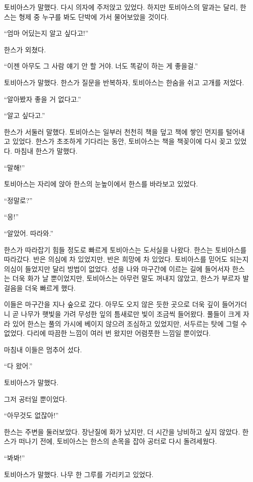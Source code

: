 토비아스가 말했다. 다시 의자에 주저앉고 있었다. 하지만 토비아스의 말과는 달리, 한스는 형제 중 누구를 봐도 단박에 가서 물어보았을 것이다.

``엄마 어딨는지 알고 싶다고!''

한스가 외쳤다.

``이젠 아무도 그 사람 얘기 안 할 거야. 너도 똑같이 하는 게 좋을걸.''

토비아스가 말했다. 한스가 질문을 반복하자, 토비아스는 한숨을 쉬고 고개를 저었다.

``알아봤자 좋을 거 없다고.''

``알고 싶다고.''

한스가 서둘러 말했다. 토비아스는 일부러 천천히 책을 덮고 책에 쌓인 먼지를 털어내고 있었다. 한스가 초조하게 기다리는 동안, 토비아스는 책을 책꽂이에 다시 꽂고 있었다. 마침내 한스가 말했다.

``말해!''

토비아스는 자리에 앉아 한스의 눈높이에서 한스를 바라보고 있었다.

``정말로?''

``응!''

``알았어. 따라와.''

한스가 따라잡기 힘들 정도로 빠르게 토비아스는 도서실을 나왔다. 한스는 토비아스를 따라갔다. 반은 의심에 차 있었지만, 반은 희망에 차 있었다. 토비아스를 믿어도 되는지 의심이 들었지만 달리 방법이 없었다. 성을 나와 마구간에 이르는 길에 들어서자 한스는 더욱 화가 날 뿐이었지만, 토비아스는 아무런 말도 꺼내지 않았고, 한스가 부르자 발걸음을 더욱 빠르게 했다.

이들은 마구간을 지나 숲으로 갔다. 아무도 오지 않은 듯한 곳으로 더욱 깊이 들어가더니 곧 나무가 햇빛을 가려 무성한 잎의 틈새로만 빛이 조금씩 들어왔다. 풀들이 크게 자라 있어 한스는 풀의 가시에 베이지 않으려 조심하고 있었지만, 서두르는 탓에 그럴 수 없었다. 다리에 따끔한 느낌이 여러 번 왔지만 어렴풋한 느낌일 뿐이었다.

마침내 이들은 멈추어 섰다.

``다 왔어.''

토비아스가 말했다.

그저 공터일 뿐이었다.

``아무것도 없잖아!''

한스는 주변을 둘러보았다. 장난질에 화가 났지만, 더 시간을 낭비하고 싶지 않았다. 한스가 떠나기 전에, 토비아스는 한스의 손목을 잡아 공터로 다시 돌려세웠다.

``봐봐!''

토비아스가 말했다. 나무 한 그루를 가리키고 있었다.

